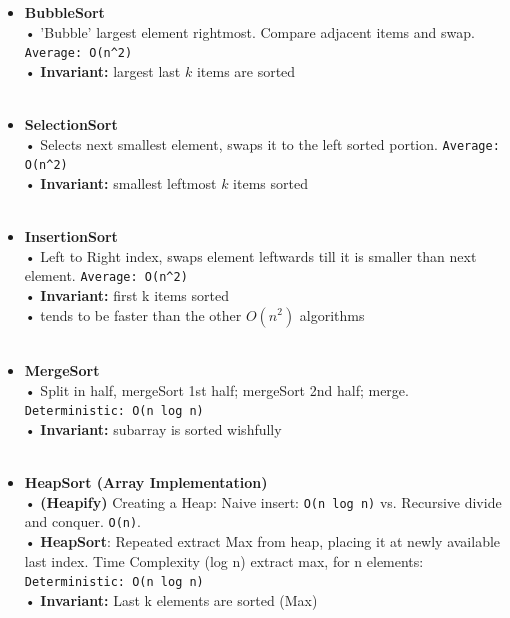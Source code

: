 \documentclass[10pt, landscape]{article}
\newcommand{\code}[1]{\colorbox{gray!25!}{\lstinline|#1|}}
\begin{document}
\begin{multicols}{4}
\begin{itemize}
    \item \textbf{BubbleSort}
    	\\ • 'Bubble' largest element rightmost. Compare adjacent items and swap. \code{Average: O(n^2)}
    	\\ • \textbf{Invariant:} largest last $k$ items are sorted
    	~\\ ~\\
    	
    \item \textbf{SelectionSort} 
    	\\ • Selects next smallest element, swaps it to the left sorted portion. \code{Average: O(n^2)}
    	\\ • \textbf{Invariant:} smallest leftmost $k$ items sorted
    	~\\ ~\\
    	
    \item \textbf{InsertionSort} 
	\\ • Left to Right index, swaps element leftwards till it is smaller than next element. \code{Average: O(n^2)}
    	\\ • \textbf{Invariant:} first k items sorted
    	\\ •  tends to be faster than the other $O(n^2)$ algorithms
    	~\\ ~\\
    	
    \item \textbf{MergeSort} 
	\\ • Split in half, mergeSort 1st half; mergeSort 2nd half; merge.  \code{Deterministic: O(n log n)}
    	\\ • \textbf{Invariant:} subarray is sorted wishfully
    	~\\ ~\\
    	
    \item \textbf{HeapSort (Array Implementation)}
    	\\ • \textbf{(Heapify)} Creating a Heap: Naive insert: \code{O(n log n)} vs. Recursive divide and conquer. \code{O(n)}. 
  	\\ • \textbf{HeapSort}: Repeated extract Max from heap, placing it at newly available last index. Time Complexity (log n) extract max, for n elements:  \code{Deterministic: O(n log n)}
    	\\ • \textbf{Invariant:} Last k elements are sorted (Max)
    	~\\ ~\\
    	

\end{itemize}
\end{multicols}
\end{document}
